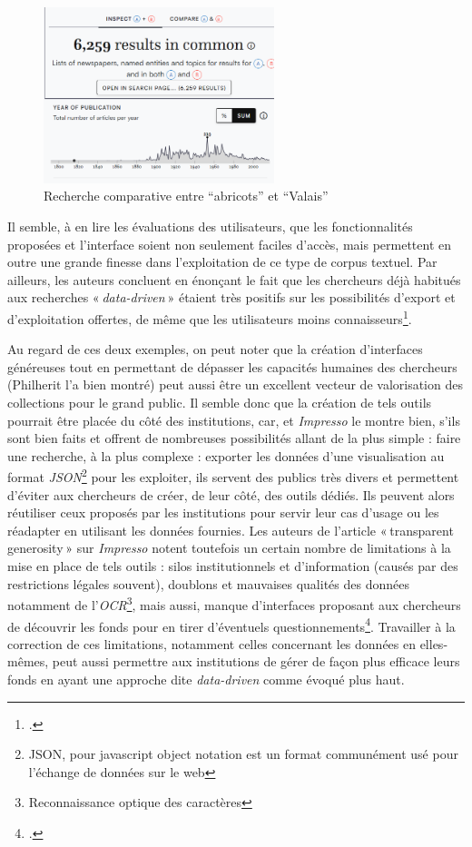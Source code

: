 \begin{figure}[h!]
	\centering
	\includegraphics[width=0.6\textwidth]{images/image17.png}
	\caption{Recherche comparative entre \enquote{abricots} et \enquote{Valais}}
	\label{fig:image17}
\end{figure}

Il semble, à en lire les évaluations des utilisateurs, que les fonctionnalités proposées et l’interface soient non seulement faciles d’accès, mais permettent en outre une grande finesse dans l’exploitation de ce type de corpus textuel. Par ailleurs, les auteurs concluent en énonçant le fait que les chercheurs déjà habitués aux recherches « \textit{data-driven} » étaient très positifs sur les possibilités d’export et d’exploitation offertes, de même que les utilisateurs moins connaisseurs\footcite[pp. 5-7]{during_transparent_2024}.

Au regard de ces deux exemples, on peut noter que la création d’interfaces généreuses tout en permettant de dépasser les capacités humaines des chercheurs (Philherit l’a bien montré) peut aussi être un excellent vecteur de valorisation des collections pour le grand public. Il semble donc que la création de tels outils pourrait être placée du côté des institutions, car, et \textit{Impresso} le montre bien, s’ils sont bien faits et offrent de nombreuses possibilités allant de la plus simple : faire une recherche, à la plus complexe : exporter les données d’une visualisation au format \textit{JSON}\footnote{JSON, pour javascript object notation est un format communément usé pour l'échange de données sur le web} pour les exploiter, ils servent des publics très divers et permettent d’éviter aux chercheurs de créer, de leur côté, des outils dédiés. Ils peuvent alors réutiliser ceux proposés par les institutions pour servir leur cas d’usage ou les réadapter en utilisant les données fournies. Les auteurs de l’article « transparent generosity » sur \textit{Impresso} notent toutefois un certain nombre de limitations à la mise en place de tels outils : silos institutionnels et d’information (causés par des restrictions légales souvent), doublons et mauvaises qualités des données notamment de l’\textit{OCR}\footnote{Reconnaissance optique des caractères}, mais aussi, manque d’interfaces proposant aux chercheurs de découvrir les fonds pour en tirer d’éventuels questionnements\footcite[pp. 1-2]{during_transparent_2024}. Travailler à la correction de ces limitations, notamment celles concernant les données en elles-mêmes, peut aussi permettre aux institutions de gérer de façon plus efficace leurs fonds en ayant une approche dite \textit{data-driven} comme évoqué plus haut.

